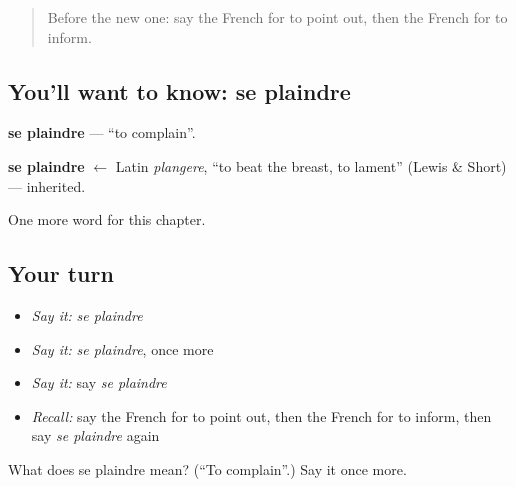 \begin{quote}
Before the new one: say the French for to point out, then the French for to inform.
\end{quote}

\subsection*{You'll want to know: se plaindre}
\textbf{se plaindre} — \textquotedblleft{}to complain\textquotedblright{}.

\begin{cousinweb}
\textbf{se plaindre} $\leftarrow$ Latin \emph{plangere}, \textquotedblleft{}to beat the breast, to lament\textquotedblright{} (Lewis \& Short) — inherited.
\end{cousinweb}

\begin{grammarlens}[title={What you've built}]
One more word for this chapter.
\end{grammarlens}

\subsection*{Your turn}
\begin{itemize}
\raggedright
  \item \emph{Say it:} \emph{se plaindre}
  \item \emph{Say it:} \emph{se plaindre}, once more
  \item \emph{Say it:} say \emph{se plaindre}
  \item \emph{Recall:} say the French for to point out, then the French for to inform, then say \emph{se plaindre} again
\end{itemize}

\begin{tcolorbox}[breakable,colback=teal!4,colframe=teal!35!black,title={Before you move on}]
What does se plaindre mean? (\textquotedblleft{}To complain\textquotedblright{}.) Say it once more.
\end{tcolorbox}
